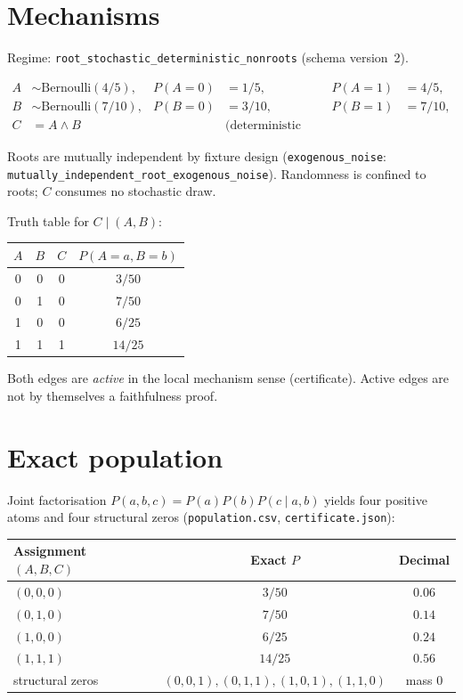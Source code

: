 \documentclass[11pt]{article}
\begin{document}
\section{Mechanisms}

Regime: \texttt{root\_stochastic\_deterministic\_nonroots} (schema version~2).

\begin{align*}
A &\sim \mathrm{Bernoulli}(4/5),
& P(A{=}0)&=1/5,& P(A{=}1)&=4/5,\\
B &\sim \mathrm{Bernoulli}(7/10),
& P(B{=}0)&=3/10,& P(B{=}1)&=7/10,\\
C &= A \land B
&&\text{(deterministic point-mass CPT).}
\end{align*}

Roots are mutually independent by fixture design
(\texttt{exogenous\_noise}: \texttt{mutually\_independent\_root\_exogenous\_noise}).
Randomness is confined to roots; \(C\) consumes no stochastic draw.

Truth table for \(C\mid(A,B)\):

\begin{center}
\begin{tabular}{@{}cccc@{}}
\toprule
\(A\) & \(B\) & \(C\) & \(P(A{=}a,B{=}b)\) \\
\midrule
0 & 0 & 0 & \(3/50\) \\
0 & 1 & 0 & \(7/50\) \\
1 & 0 & 0 & \(6/25\) \\
1 & 1 & 1 & \(14/25\) \\
\bottomrule
\end{tabular}
\end{center}

Both edges are \emph{active} in the local mechanism sense (certificate).
Active edges are not by themselves a faithfulness proof.

\section{Exact population}

Joint factorisation \(P(a,b,c)=P(a)P(b)P(c\mid a,b)\) yields four positive atoms
and four structural zeros (\texttt{population.csv}, \texttt{certificate.json}):

\begin{center}
\begin{tabular}{@{}lcc@{}}
\toprule
Assignment \((A,B,C)\) & Exact \(P\) & Decimal \\
\midrule
\((0,0,0)\) & \(3/50\) & \(0.06\) \\
\((0,1,0)\) & \(7/50\) & \(0.14\) \\
\((1,0,0)\) & \(6/25\) & \(0.24\) \\
\((1,1,1)\) & \(14/25\) & \(0.56\) \\
\midrule
structural zeros &
\((0,0,1),(0,1,1),(1,0,1),(1,1,0)\) & mass \(0\) \\
\bottomrule
\end{tabular}
\end{center}
\end{document}
